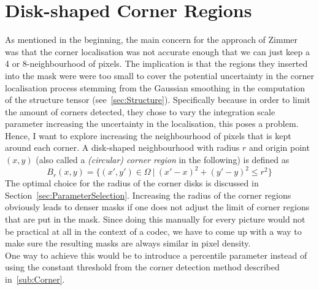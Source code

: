 \section{Disk-shaped Corner Regions}\label{sec:Contribution}
As mentioned in the beginning, the main concern for the approach of Zimmer~\cite{zimmer07} was that the 
corner localisation was not accurate enough that we can just keep a 4 or 8-neighbourhood 
of pixels. The implication is that the regions they inserted into the mask were were too small to
cover the potential uncertainty in the corner localisation process stemming from the Gaussian
smoothing in the computation of the structure tensor (see~\ref{sec:Structure}). Specifically
because in order to limit the amount of corners detected, they chose to vary the integration scale
parameter increasing the uncertainty in the localisation, this poses a problem.\newpage\noindent
Hence, I want to explore increasing the neighbourhood of pixels that is kept around each
corner. A disk-shaped neighbourhood with radius $r$ and origin point $(x, y)$ (also called a
\textit{(circular) corner region} in the following) is defined as 
\begin{equation}
    B_r(x, y) = \lbrace (x',y') \in \Omega\ \vert\ {(x'-x)}^2 + {(y'-y)}^2 \leq r^2\rbrace
\end{equation}
The optimal choice for the radius of the corner disks is discussed in
Section~\ref{sec:ParameterSelection}.
Increasing the radius of the corner regions obviously leads to denser masks if one does not adjust
the limit of corner regions that are put in the mask. Since doing this manually for every picture
would not be practical at all in the context of a codec, we have to come up with a way to make sure
the resulting masks are always similar in pixel density.\\
One way to achieve this would be to introduce a percentile parameter instead of using the constant
threshold from the corner detection method described in~\ref{sub:Corner}.

